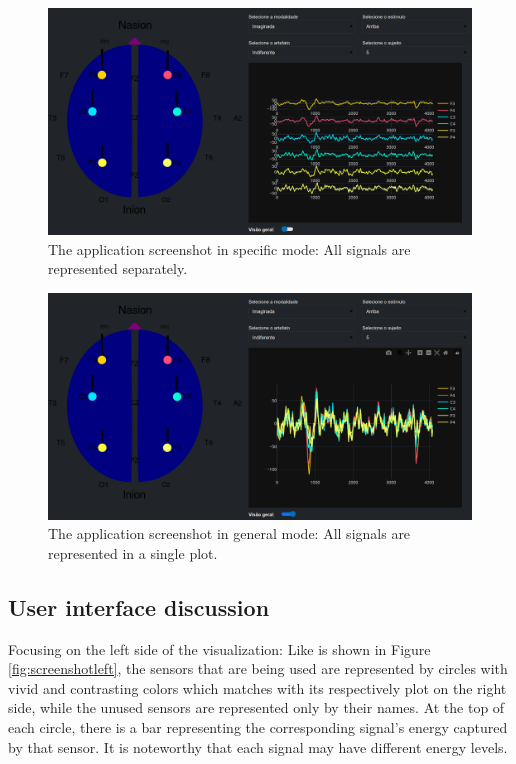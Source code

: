 \documentclass[format=sigconf]{acmart}
\begin{document}
		\begin{figure}[h]
			\centering
			\includegraphics[width=\linewidth]{images/screenshot01}
			\caption{The application screenshot in specific mode: All signals are represented separately.}
			\label{fig:screenshot01}
		\end{figure}
		
		\begin{figure}[h]
			\centering
			\includegraphics[width=\linewidth]{images/screenshot02}
			\caption{The application screenshot in general mode: All signals are represented in a single plot.}
			\label{fig:screenshot02}
		\end{figure}
	
		\subsection{User interface discussion}
			\par Focusing on the left side of the visualization: Like is shown in Figure \ref{fig:screenshotleft}, the sensors that are being used are represented by circles with vivid and contrasting colors which matches with its respectively plot on the right side, while the unused sensors are represented only by their names. At the top of each circle, there is a bar representing the corresponding signal's energy captured by that sensor. It is noteworthy that each signal may have different energy levels.
		
\end{document}

